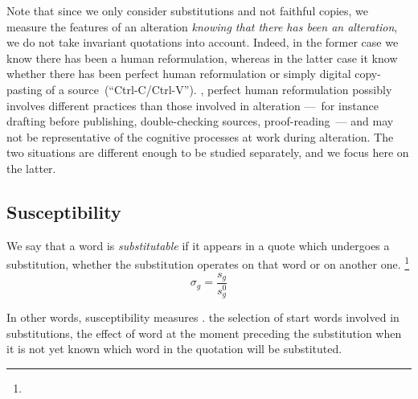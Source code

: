 Note that since we only consider substitutions and not faithful copies, we measure the features of an alteration \emph{knowing that there has been an alteration},  we do not take invariant quotations into account.
Indeed, in the former case we know there has been a human reformulation, whereas in the latter case it  know whether there has been perfect human reformulation or simply digital copy-pasting of a source~(``{\sc Ctrl-C}/{\sc Ctrl-V}'').
, perfect human reformulation possibly involves different practices than those involved in alteration ---~for instance drafting before publishing, double-checking sources, proof-reading~--- and may not be representative of the cognitive processes at work during alteration.
The two situations are different enough to be studied separately, and we focus here on the latter.

\subsection{Susceptibility}

We say that a word is \emph{substitutable} if it appears in a quote which undergoes a substitution, whether the substitution operates on that word or on another one.
\footnote{
}
$$\sigma_g = \frac{s_g}{s_g^0}$$

In other words, susceptibility measures .
 the selection of start words involved in substitutions,  the effect of word  at the moment preceding the substitution when it is not yet known which word in the quotation will be substituted.

